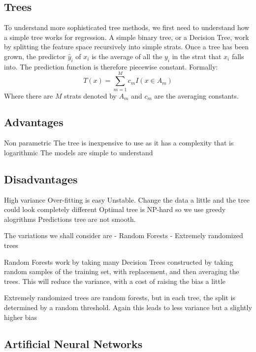\subsection{Trees}
To understand more sophisticated tree methods, we first need to understand how a simple tree works for regression.
A simple binary tree, or a Decision Tree, work by splitting the feature space recursively into simple strats. Once a tree has been grown, the predictor $\hat{y}_i$ of $x_i$ is the average of all the $y_i$ in the strat that $x_i$ falls into. The prediction function is therefore piecewise constant.
Formally:
$$
T(x) = \sum_{m=1}^M c_m I(x \in A_m)
$$
Where there are $M$ strats denoted by $A_m$ and $c_m$ are the averaging constants.

\subsection{Advantages}
Non parametric
The tree is inexpensive to use as it has a complexity that is logarithmic
The models are simple to understand
\subsection{Disadvantages}
High variance
Over-fitting is easy
Unstable. Change the data a little and the tree could look completely different
Optimal tree is NP-hard so we use greedy alogrithms
Predictions tree are not smooth.


The variations we shall consider are
- Random Forests
- Extremely randomized trees

Random Forests work by taking many Decision Trees constructed by taking random samples of the training set, with replacement, and then averaging the trees. This will reduce the variance, with a cost of raising the bias a little

Extremely randomized trees are random forests, but in each tree, the split is determined by a random threshold. Again this leads to less variance but a slightly higher bias

\subsection{Artificial Neural Networks}